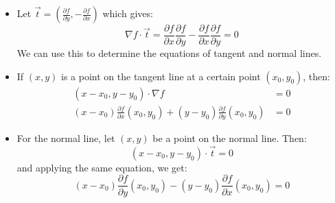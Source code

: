 \begin{itemize}
\begin{theorem}
\begin{proof}
        \end{proof}
    \end{theorem}
    \item Let $\vec{t} = \left(\frac{\partial f}{\partial y}, -\frac{\partial f}{\partial x}\right)$ which gives:
    \begin{equation}
        \nabla f \cdot \vec{t} = \frac{\partial f}{\partial x} \frac{\partial f}{\partial y} - \frac{\partial f}{\partial x}\frac{\partial f}{\partial y} = 0
    \end{equation}
    We can use this to determine the equations of tangent and normal lines.
    \item If $(x,y)$ is a point on the tangent line at a certain point $(x_0,y_0)$, then:
    \begin{align}
        (x-x_0, y-y_0) \cdot \nabla f &= 0 \\ 
        (x-x_0)\frac{\partial f}{\partial x}(x_0,y_0) + (y-y_0)\frac{\partial f}{\partial y}(x_0, y_0) &= 0
    \end{align}
    \item For the normal line, let $(x,y)$ be a point on the normal line. Then:
    \begin{equation}
        (x-x_0, y-y_0)\cdot \vec{t} = 0
    \end{equation}
    and applying the same equation, we get:
    \begin{equation}
        (x-x_0)\frac{\partial f}{\partial y} (x_0,y_0) - (y-y_0)\frac{\partial f}{\partial x}(x_0,y_0)=0
    \end{equation}
\end{itemize}